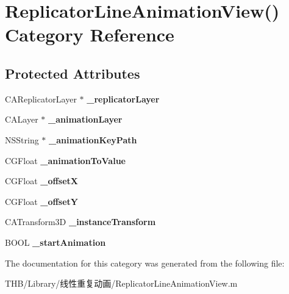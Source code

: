 \hypertarget{category_replicator_line_animation_view_07_08}{}\section{Replicator\+Line\+Animation\+View() Category Reference}
\label{category_replicator_line_animation_view_07_08}
\subsection*{Protected Attributes}
\begin{DoxyCompactItemize}
\item 
\mbox{\label{category_replicator_line_animation_view_07_08_abaa29d8619de5ebc475edc0a47397691}} 
C\+A\+Replicator\+Layer $\ast$ {\bfseries \+\_\+replicator\+Layer}
\item 
\mbox{\label{category_replicator_line_animation_view_07_08_ab3a3f637a11ac55b0c31c5297de72483}} 
C\+A\+Layer $\ast$ {\bfseries \+\_\+animation\+Layer}
\item 
\mbox{\label{category_replicator_line_animation_view_07_08_a81f38323b3a17ef2e74bd35de0bd2e23}} 
N\+S\+String $\ast$ {\bfseries \+\_\+animation\+Key\+Path}
\item 
\mbox{\label{category_replicator_line_animation_view_07_08_aaac285184836e387ebff7255eb21318a}} 
C\+G\+Float {\bfseries \+\_\+animation\+To\+Value}
\item 
\mbox{\label{category_replicator_line_animation_view_07_08_a070b657702509d1e35269b09e1ec6920}} 
C\+G\+Float {\bfseries \+\_\+offsetX}
\item 
\mbox{\label{category_replicator_line_animation_view_07_08_a23a4e595ce76b811c8ab27cc24957435}} 
C\+G\+Float {\bfseries \+\_\+offsetY}
\item 
\mbox{\label{category_replicator_line_animation_view_07_08_aa3eec4db09c3ede6bc06dcf7f0bc7f64}} 
C\+A\+Transform3D {\bfseries \+\_\+instance\+Transform}
\item 
\mbox{\label{category_replicator_line_animation_view_07_08_a89525d354319b5586445942d2da259db}} 
B\+O\+OL {\bfseries \+\_\+start\+Animation}
\end{DoxyCompactItemize}


The documentation for this category was generated from the following file\+:\begin{DoxyCompactItemize}
\item 
T\+H\+B/\+Library/线性重复动画/Replicator\+Line\+Animation\+View.\+m\end{DoxyCompactItemize}

